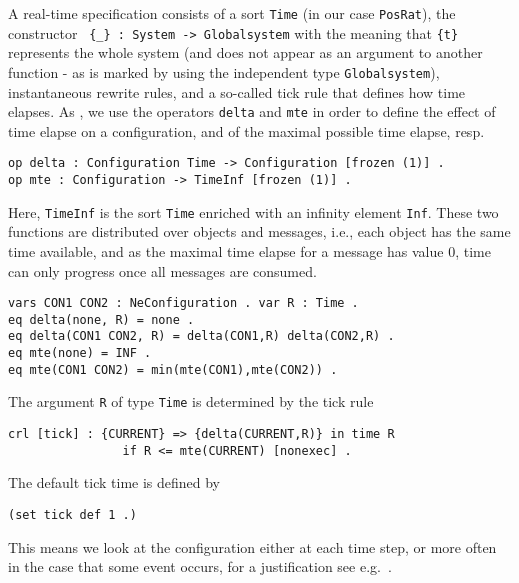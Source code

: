 A real-time specification \cite{PO07b} consists of a sort \verb|Time|
(in our case \verb|PosRat|), the constructor
%
\verb| {_} : System -> Globalsystem|
%
with the meaning that \verb|{t}| represents the whole system (and does not appear
as an argument to another function - as is marked by using the independent type \texttt{Globalsystem}),
instantaneous rewrite rules, and a so-called tick rule that defines how time elapses.
%
As \cite{PO07}, we use the operators \verb|delta| and \verb|mte| in
order to define the effect of time elapse on a configuration, and of the
maximal possible time elapse, resp.
%
\begin{lstlisting}[columns=fixed]
op delta : Configuration Time -> Configuration [frozen (1)] . 
op mte : Configuration -> TimeInf [frozen (1)] .
\end{lstlisting}
Here, \texttt{TimeInf} is the sort \texttt{Time} enriched with an infinity element
\texttt{Inf}. These two functions are distributed
over objects and messages, i.e., each
object has the same time available, and as the maximal time elapse
for a message has value 0, time can only progress once all messages
are consumed.
%
\begin{lstlisting}[columns=fixed]
vars CON1 CON2 : NeConfiguration . var R : Time .
eq delta(none, R) = none .
eq delta(CON1 CON2, R) = delta(CON1,R) delta(CON2,R) . 
eq mte(none) = INF .
eq mte(CON1 CON2) = min(mte(CON1),mte(CON2)) .
\end{lstlisting}
%
The argument {\tt R} of type {\tt Time} is determined by the tick rule 
%
\begin{lstlisting}
crl [tick] : {CURRENT} => {delta(CURRENT,R)} in time R 
                if R <= mte(CURRENT) [nonexec] .
\end{lstlisting}
%
The default tick time is defined by
\begin{lstlisting}[columns=fixed]
(set tick def 1 .) 
\end{lstlisting}
%
This means we look at the configuration either at each time step, or
more often in the case that some event occurs, for a justification see
e.g.\ \cite{PO06}.


